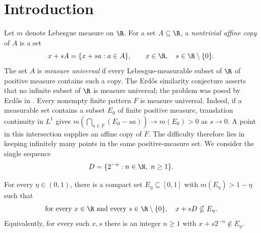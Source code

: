 \section{Introduction}\label{sec:introduction}

Let $m$ denote Lebesgue measure on $\R$. For a set $A\subseteq\R$, a
\emph{nontrivial affine copy} of $A$ is a set
\[
 x+sA=\{x+sa:a\in A\},\qquad x\in\R,\quad s\in\R\setminus\{0\}.
\]
The set $A$ is \emph{measure universal} if every Lebesgue-measurable subset
of $\R$ of positive measure contains such a copy. The Erd\H{o}s similarity
conjecture asserts that no infinite subset of $\R$ is measure universal;
the problem was posed by Erd\H{o}s in
\cite[Problem~4.33.7*]{Erdos1974Problems}.
Every nonempty finite pattern $F$ is measure universal. Indeed, if a measurable
set contains a subset $E_0$ of finite positive measure, translation
continuity in $L^1$ gives
$m(\bigcap_{a\in F}(E_0-sa))\to m(E_0)>0$ as $s\to0$.
A point in this intersection supplies an affine copy of $F$.
The difficulty therefore lies in keeping infinitely many points in the
same positive-measure set. We consider the single sequence
\[
 D=\{2^{-n}:n\in\N,\ n\ge1\}.
\]

\begin{theorem}\label{thm:main}
For every $\eta\in(0,1)$, there is a compact set $E_\eta\subseteq[0,1]$
with $m(E_\eta)>1-\eta$ such that
\[
 \text{for every }x\in\R\text{ and every }s\in\R\setminus\{0\},
 \quad x+sD\nsubseteq E_\eta.
\]
Equivalently, for every such $x,s$ there is an integer $n\ge1$ with
$x+s2^{-n}\notin E_\eta$.
\end{theorem}

